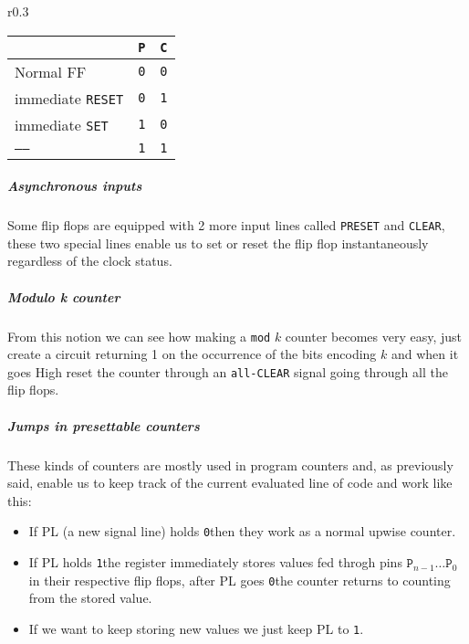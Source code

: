 \documentclass{scrartcl}
\newcommand{\zero}{\texttt{0}}
\newcommand{\one}{\texttt{1}}
\begin{document}
    \begin{wrapfigure}[9]{r}{0.3\textwidth}
        \centering
        \begin{tabular}{| l | c | c |}
            \hline
            & \texttt{P} & \texttt{C} \\\hline
            Normal FF & \zero & \zero\\
            immediate \texttt{RESET} & \zero & \one\\
            immediate \texttt{SET} & \one & \zero\\
            \texttt{-----} & \one & \one\\\hline
        \end{tabular}
    \end{wrapfigure}
    \vspace{-1cm}
    \subparagraph{Asynchronous inputs} Some flip flops are equipped with 2 more input lines called \texttt{PRESET} and \texttt{CLEAR}, these two special lines enable us to set or reset the flip flop instantaneously regardless of the clock status.
    \subparagraph{Modulo k counter} From this notion we can see how making a \texttt{mod} $k$ counter becomes very easy, just create a circuit returning 1 on the occurrence of the bits encoding $k$ and when it goes High reset the counter through an \texttt{all-CLEAR} signal going through all the flip flops.
    \subparagraph{Jumps in presettable counters} These kinds of counters are mostly used in program counters and, as previously said, enable us to keep track of the current evaluated line of code and work like this:
    \begin{itemize}
        \item If PL (a new signal line) holds \zero then they work as a normal upwise counter.
        \item If PL holds \one the register immediately stores values fed throgh pins $\texttt{P}_{n-1}\dots\texttt{P}_0$ in their respective flip flops, after PL goes \zero the counter returns to counting from the stored value.
        \item If we want to keep storing new values we just keep PL to \one.
    \end{itemize}
\end{document}
